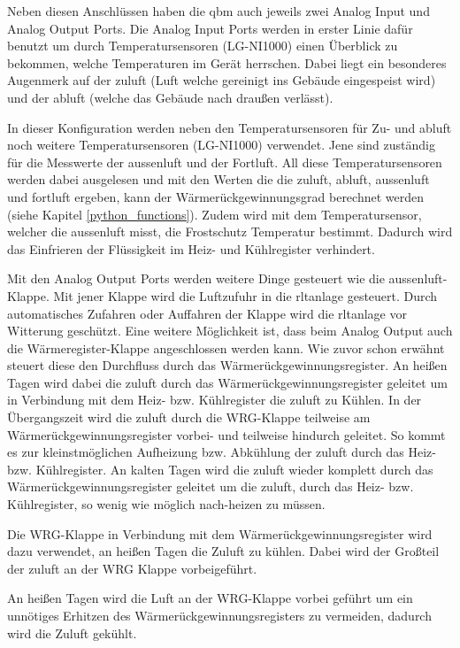 Neben diesen Anschlüssen haben die \gls{qbm}  auch jeweils zwei Analog Input und Analog Output Ports. Die Analog Input Ports werden in erster Linie dafür benutzt um durch Temperatursensoren (LG-NI1000) einen Überblick zu bekommen, welche Temperaturen im Gerät herrschen. Dabei liegt ein besonderes Augenmerk auf der \gls{zuluft} (Luft welche gereinigt ins Gebäude eingespeist wird) und der \gls{abluft} (welche das Gebäude nach draußen verlässt).

In dieser Konfiguration werden neben den Temperatursensoren für Zu- und \gls{abluft} noch weitere Temperatursensoren (LG-NI1000) verwendet. Jene sind zuständig für die Messwerte der \gls{aussenluft} und der Fortluft. All diese Temperatursensoren werden dabei ausgelesen und mit den Werten die die \gls{zuluft}, \gls{abluft}, \gls{aussenluft} und \gls{fortluft} ergeben, kann der Wärmerückgewinnungsgrad berechnet werden (siehe Kapitel \ref{python_functions}). Zudem wird mit dem Temperatursensor, welcher die \gls{aussenluft} misst, die Frostschutz Temperatur bestimmt. Dadurch wird das Einfrieren der Flüssigkeit im Heiz- und Kühlregister verhindert.

Mit den Analog Output Ports werden weitere Dinge gesteuert wie \zB die \gls{aussenluft}-Klappe. Mit jener Klappe wird die Luftzufuhr in die \ac{rltanlage} gesteuert. Durch automatisches Zufahren oder Auffahren der Klappe wird die \ac{rltanlage} vor Witterung geschützt. Eine weitere Möglichkeit ist, dass beim Analog Output auch die Wärmeregister-Klappe angeschlossen werden kann. Wie zuvor schon erwähnt steuert diese den Durchfluss durch das Wärmerückgewinnungsregister. An heißen Tagen wird dabei die \gls{zuluft} durch das Wärmerückgewinnungsregister geleitet um in Verbindung mit dem Heiz- bzw. Kühlregister die \gls{zuluft} zu Kühlen. In der Übergangszeit wird die \gls{zuluft} durch die WRG-Klappe teilweise am Wärmerückgewinnungsregister vorbei- und teilweise hindurch geleitet. So kommt es zur kleinstmöglichen Aufheizung bzw. Abkühlung der \gls{zuluft} durch das Heiz- bzw. Kühlregister. An kalten Tagen wird die \gls{zuluft} wieder komplett durch das Wärmerückgewinnungsregister geleitet um die \gls{zuluft}, durch das Heiz- bzw. Kühlregister, so wenig wie möglich nach-heizen zu müssen. 


Die WRG-Klappe in Verbindung mit dem Wärmerückgewinnungsregister wird dazu verwendet, an heißen Tagen die Zuluft zu kühlen. Dabei wird der Großteil der \gls{zuluft} an der WRG Klappe vorbeigeführt.  


An heißen Tagen wird die Luft an der WRG-Klappe vorbei geführt um ein unnötiges Erhitzen des Wärmerückgewinnungsregisters zu vermeiden, dadurch wird die Zuluft gekühlt.

